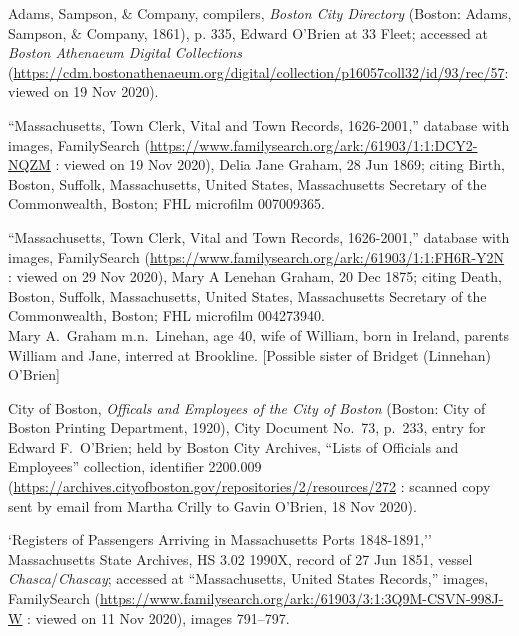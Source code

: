 \begin{thebibliography}{999}
	Adams, Sampson, \& Company, compilers, \textit{Boston City Directory} (Boston: Adams, Sampson, \& Company, 1861), p. 335, Edward O'Brien at 33 Fleet; accessed at \textit{Boston Athenaeum Digital Collections} (\url{https://cdm.bostonathenaeum.org/digital/collection/p16057coll32/id/93/rec/57}: viewed on 19 Nov 2020).
	
	``Massachusetts, Town Clerk, Vital and Town Records, 1626-2001,'' database with images, FamilySearch (\url{https://www.familysearch.org/ark:/61903/1:1:DCY2-NQZM} : viewed on 19 Nov 2020), Delia Jane Graham, 28 Jun 1869; citing Birth, Boston, Suffolk, Massachusetts, United States, Massachusetts Secretary of the Commonwealth, Boston; FHL microfilm 007009365.
	
	``Massachusetts, Town Clerk, Vital and Town Records, 1626-2001,'' database with images, FamilySearch (\url{https://www.familysearch.org/ark:/61903/1:1:FH6R-Y2N} : viewed on 29 Nov 2020), Mary A Lenehan Graham, 20 Dec 1875; citing Death, Boston, Suffolk, Massachusetts, United States, Massachusetts Secretary of the Commonwealth, Boston; FHL microfilm 004273940.\\
	Mary A.\ Graham m.n.\ Linehan, age 40, wife of William, born in Ireland, parents William and Jane, interred at Brookline. [Possible sister of Bridget (Linnehan) O'Brien]
	
	City of Boston, \textit{Officals and Employees of the City of Boston} (Boston: City of Boston Printing Department, 1920), City Document No.\ 73, p.\ 233, 
	entry for Edward F.\ O'Brien; held by Boston City Archives, ``Lists of Officials and Employees'' collection, identifier 2200.009 (\url{https://archives.cityofboston.gov/repositories/2/resources/272} : scanned copy sent by email from Martha Crilly to Gavin O'Brien, 18 Nov 2020).
	
	`Registers of Passengers Arriving in Massachusetts Ports 1848-1891,'' Massachusetts State Archives, HS 3.02 1990X, record of 27 Jun 1851, vessel \textit{Chasca}/\textit{Chascay}; accessed at ``Massachusetts, United States Records,'' images, FamilySearch (\url{https://www.familysearch.org/ark:/61903/3:1:3Q9M-CSVN-998J-W} : viewed on 11 Nov 2020), images 791--797.
	

\end{thebibliography}
